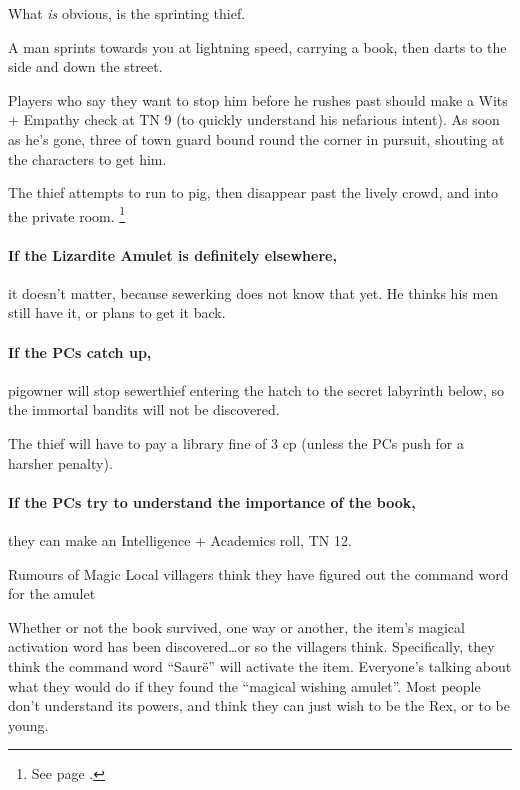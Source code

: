 \begin{multicols}{2}
What \emph{is} obvious, is the sprinting thief.

\begin{boxtext}

  A man sprints towards you at lightning speed, carrying a book, then darts to the side and down the street.

\end{boxtext}

Players who say they want to stop him before he rushes past should make a Wits + Empathy check at TN 9 (to quickly understand his nefarious intent).
As soon as he's gone, three of \gls{town} \gls{guard} bound round the corner in pursuit, shouting at the characters to get him.

The thief attempts to run to \gls{pig}, then disappear past the lively crowd, and into the private room.%
\footnote{See page \pageref{pigPrivate}.}

\sewerthief

\paragraph{If the Lizardite Amulet is definitely elsewhere,}
it doesn't matter, because \gls{sewerking} does not know that yet.
He thinks his men still have it, or plans to get it back.

\paragraph{If the PCs catch up,}
\gls{pigowner} will stop \gls{sewerthief} entering the hatch to the secret labyrinth below, so the immortal bandits will not be discovered.

The thief will have to pay a library fine of 3 cp (unless the PCs push for a harsher penalty).

\paragraph{If the PCs try to understand the importance of the book,}
they can make an Intelligence + Academics roll, TN 12.

{\squash Rumours of Magic}%
{Local villagers think they have figured out the command word for the amulet}%

Whether or not the book survived, one way or another, the item's magical activation word has been discovered\ldots or so the villagers think.
Specifically, they think the command word ``Saur\"{e}'' will activate the item.
Everyone's talking about what they would do if they found the ``magical wishing amulet''.
Most people don't understand its powers, and think they can just wish to be the Rex, or to be young.


\end{multicols}
